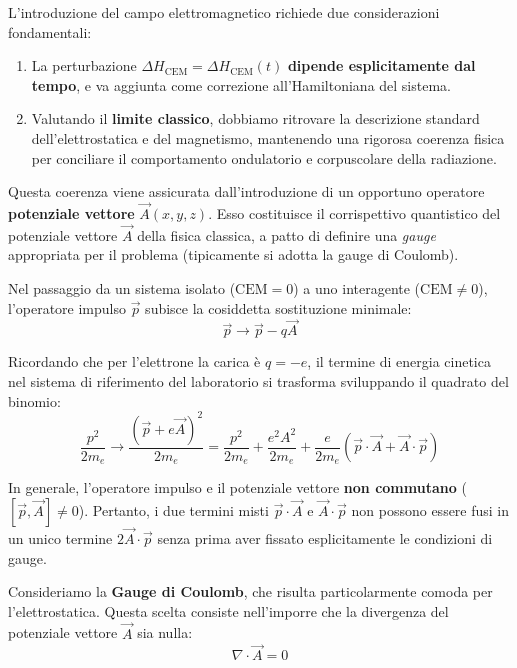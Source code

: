 L'introduzione del campo elettromagnetico richiede due considerazioni fondamentali:
\begin{enumerate}
    \item La perturbazione \( \Delta H_{\text{CEM}} = \Delta H_{\text{CEM}}(t) \) \textbf{dipende esplicitamente dal tempo}, e va aggiunta come correzione all'Hamiltoniana del sistema.
    \item Valutando il \textbf{limite classico}, dobbiamo ritrovare la descrizione standard dell'elettrostatica e del magnetismo, mantenendo una rigorosa coerenza fisica per conciliare il comportamento ondulatorio e corpuscolare della radiazione.
\end{enumerate}

Questa coerenza viene assicurata dall'introduzione di un opportuno operatore \textbf{potenziale vettore} \( \vec{A}(x,y,z) \). Esso costituisce il corrispettivo quantistico del potenziale vettore \( \vec{A} \) della fisica classica, a patto di definire una \textit{gauge} appropriata per il problema (tipicamente si adotta la gauge di Coulomb).

Nel passaggio da un sistema isolato (\( \text{CEM} = 0 \)) a uno interagente (\( \text{CEM} \neq 0 \)), l'operatore impulso \( \vec{p} \) subisce la cosiddetta sostituzione minimale: 
\begin{equation}
    \vec{p} \longrightarrow \vec{p} - q\vec{A}
\end{equation}

Ricordando che per l'elettrone la carica è \( q = -e \), il termine di energia cinetica nel sistema di riferimento del laboratorio si trasforma sviluppando il quadrato del binomio:
\begin{equation}
    \frac{p^2}{2m_e} \longrightarrow \frac{(\vec{p} + e\vec{A})^2}{2m_e} = \frac{p^2}{2m_e} + \frac{e^2 A^2}{2m_e} + \frac{e}{2m_e} (\vec{p} \cdot \vec{A} + \vec{A} \cdot \vec{p})
\end{equation}

\begin{attention}
    In generale, l'operatore impulso e il potenziale vettore \textbf{non commutano} (\( [\vec{p}, \vec{A}] \neq 0 \)). Pertanto, i due termini misti \( \vec{p} \cdot \vec{A} \) e \( \vec{A} \cdot \vec{p} \) non possono essere fusi in un unico termine \( 2\vec{A} \cdot \vec{p} \) senza prima aver fissato esplicitamente le condizioni di gauge.
\end{attention}


Consideriamo la \textbf{Gauge di Coulomb}, che risulta particolarmente comoda per l'elettrostatica. Questa scelta consiste nell'imporre che la divergenza del potenziale vettore \( \vec{A} \) sia nulla:
\begin{equation}
    \nabla \cdot \vec{A} = 0
\end{equation}

